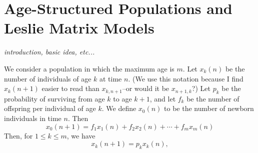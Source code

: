 \section{Age-Structured Populations and Leslie Matrix Models}
\emph{introduction, basic idea, etc...}

We consider a population in which the maximum
age is $m$.
Let $x_{k}(n)$ be the number of individuals
of age $k$ at time $n$.
(We use this notation because
I find $x_{k}(n+1)$
easier to read than $x_{k,n+1}$--or would it be $x_{n+1,k}$?)
Let
$p_k$ be the probability of surviving from age $k$
to age $k+1$,
and let $f_k$ be the number of offspring per individual
of age $k$.
We define $x_0(n)$ to be the number of newborn individuals
in time $n$.
Then
\begin{equation}
  x_{0}(n+1) = f_1 x_{1}(n) + f_2 x_{2}(n) + \cdots + f_m x_{m}(n)
\label{eqn:leslie:newborn}
\end{equation}
Then, for $1 \le k \le m$, we have
\begin{equation}
   x_{k}(n+1) = p_k x_{k}(n),
\label{eqn:leslie:nextgen}
\end{equation}

